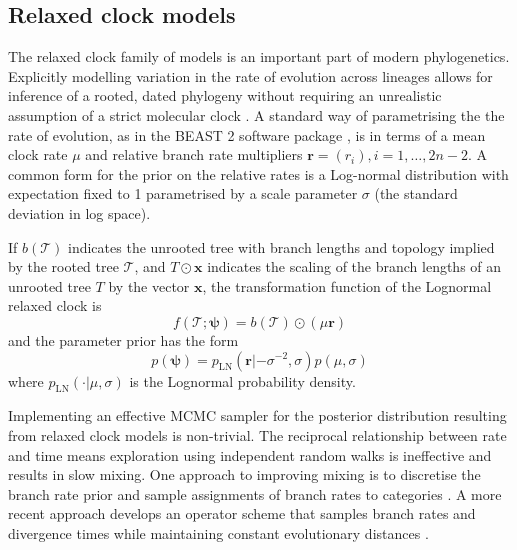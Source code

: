 \subsection*{Relaxed clock models}

The relaxed clock family of models is an important part of modern phylogenetics. Explicitly modelling variation in the rate of evolution across lineages allows for inference of a rooted, dated phylogeny without requiring an unrealistic assumption of a strict molecular clock \cite{drummond2006relaxed}. A standard way of parametrising the the rate of evolution, as in the BEAST 2 software package \cite{bouckaert2019beast}, is in terms of a mean clock rate $\mu$ and relative branch rate multipliers $\mathbf{r}=(r_i), i=1,\dots,2n-2$. A common form for the prior on the relative rates is a Log-normal distribution with expectation fixed to 1 parametrised by a scale parameter $\sigma$ (the standard deviation in log space).


If $b(\mathcal{T})$ indicates the unrooted tree with branch lengths and topology implied by the rooted tree $\mathcal{T}$, and $T \odot \mathbf{x}$ indicates the scaling of the branch lengths of an unrooted tree $T$ by the vector $\mathbf{x}$, the transformation function of the Lognormal relaxed clock is
\begin{equation*}
f(\mathcal{T}; \bm{\psi}) = b(\mathcal{T}) \odot (\mu\mathbf{r})
\end{equation*}
and the parameter prior has the form
\begin{equation*}
p(\bm{\psi}) = p_{\textrm{LN}}(\mathbf{r}|-\sigma^{-2}, \sigma)p(\mu, \sigma)
\end{equation*}
where $p_{\textrm{LN}}(\cdot|\mu, \sigma)$ is the Lognormal probability density.

Implementing an effective MCMC sampler for the posterior distribution resulting from relaxed clock models is non-trivial. The reciprocal relationship between rate and time means exploration using independent random walks is ineffective and results in slow mixing. One approach to improving mixing is to discretise the branch rate prior and sample assignments of branch rates to categories \cite{drummond2006relaxed}. A more recent approach develops an operator scheme that samples branch rates and divergence times while maintaining constant evolutionary distances \cite{zhang2020improving}.


